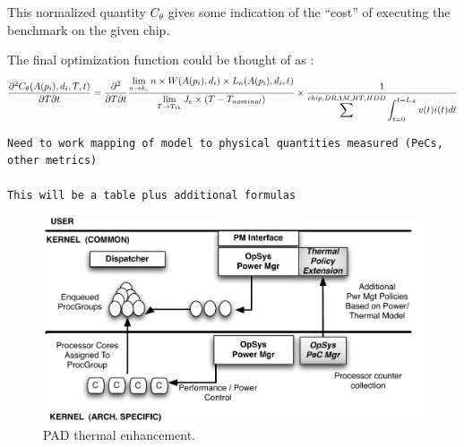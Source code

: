 \documentclass[times,12pt,onecolumn]{article}
\begin{document}
This normalized quantity $C_\theta$ gives some indication of the
``cost'' of executing the benchmark on the given chip.

The final optimization function could be thought of as :
\begin{equation}
\frac{\partial^2 C_{\theta}(A(p_i), d_i, T, t)}{\partial T \partial t} = \frac{\partial^2}{\partial T \partial t} \frac{\displaystyle \lim_{n \to k_e }n \times W(A(p_i),d_i) \times L_n(A(p_i),d_i,t)}{\displaystyle \lim_{T \to T_{th}} J_e \times (T - T_{nominal})} \\
											       \times \frac{1}{\displaystyle \sum^{chip,DRAM,HT,HDD} \int_{t=0}^{t=L_A}v(t)i(t)dt} \nonumber
\end{equation}

\begin{verbatim}
Need to work mapping of model to physical quantities measured (PeCs,
other metrics)

This will be a table plus additional formulas
\end{verbatim}

\begin{figure}[htbp]
  \centering
  \includegraphics[scale=0.40]{schedarch.pdf}
  \caption{PAD thermal enhancement.}
  \label{fig:schdarch}
\end{figure}
\end{document}
